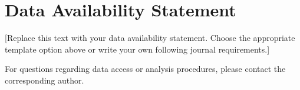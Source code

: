 

\section*{Data Availability Statement}







[Replace this text with your data availability statement. Choose the appropriate
template option above or write your own following journal requirements.]

For questions regarding data access or analysis procedures, please contact the corresponding author.

\label{data and code availability}

